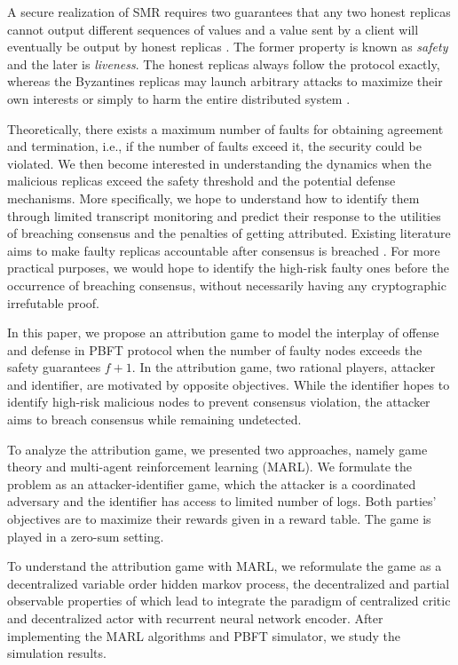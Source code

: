 \documentclass[a4paper,11pt]{article}
\begin{document}
A secure realization of SMR requires two guarantees that any two honest replicas cannot output different sequences of values and a value sent by a client will eventually be output by honest replicas \cite{sheng2021bft}. The former property is known as \emph{safety} and the later is \emph{liveness}. The honest replicas always follow the protocol exactly, whereas the Byzantines replicas may launch arbitrary attacks to maximize their own interests or simply to harm the entire distributed system \cite{Survey}.

Theoretically, there exists a maximum number of faults for obtaining agreement and termination, i.e., if the number of faults exceed it, the security could be violated. We then become interested in understanding the dynamics when the malicious replicas exceed the safety threshold and the potential defense mechanisms. More specifically, we hope to understand how to identify them through limited transcript monitoring and predict their response to the utilities of breaching consensus and the penalties of getting attributed. Existing literature aims to make faulty replicas accountable after consensus is breached \cite{sheng2021bft}. For more practical purposes, we would hope to identify the high-risk faulty ones before the occurrence of breaching consensus, without necessarily having any cryptographic irrefutable proof.

In this paper, we propose an attribution game to model the interplay of offense and defense in PBFT protocol when the number of faulty nodes exceeds the safety guarantees $f+1$. In the attribution game, two rational players, attacker and identifier, are motivated by opposite objectives. While the identifier hopes to identify high-risk malicious nodes to prevent consensus violation, the attacker aims to breach consensus while remaining undetected.

To analyze the attribution game, we presented two approaches, namely game theory and multi-agent reinforcement learning (MARL).
We formulate the problem as an attacker-identifier game, which the attacker is a coordinated adversary and the identifier has access to limited number of logs. Both parties' objectives are to maximize their rewards given in a reward table. The game is played in a zero-sum setting.

To understand the attribution game with MARL, we reformulate the game as a decentralized variable order hidden markov process, the decentralized and partial observable properties of which lead to integrate the paradigm of centralized critic and decentralized actor with recurrent neural network encoder. After implementing the MARL algorithms and PBFT simulator, we study the simulation results.
\end{document}
